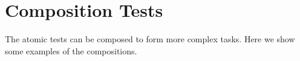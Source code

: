 \section{Composition Tests}

The atomic tests can be composed to form more complex tasks. Here we show some examples of the compositions. 

